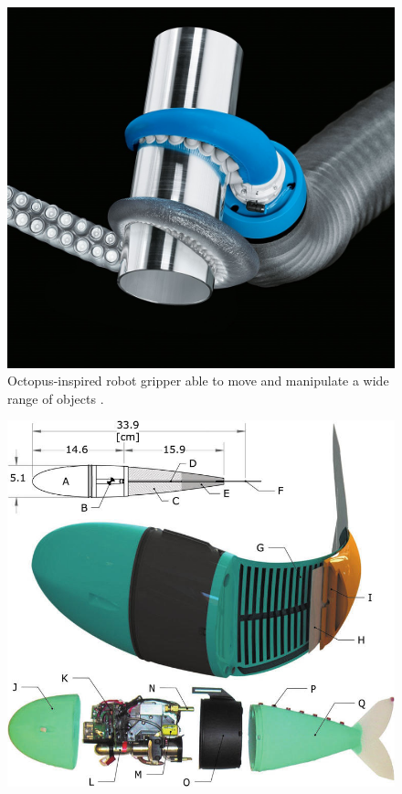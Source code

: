   \begin{minipage}{\linewidth}
      \centering
      \begin{minipage}{0.45\linewidth}
          \begin{figure}[H]
              \includegraphics[width=\linewidth]{Figures/tentaclegripper (2).jpg}
              \caption{Octopus-inspired robot gripper able to move and manipulate a wide range of objects \cite{octopus}.}
          \end{figure}
      \end{minipage}
      \hspace{0.05\linewidth}
      \begin{minipage}{0.45\linewidth}
          \begin{figure}[H]
              \includegraphics[width=\linewidth]{Figures/fish.jpg}

\end{figure}
\end{minipage}
\end{minipage}
